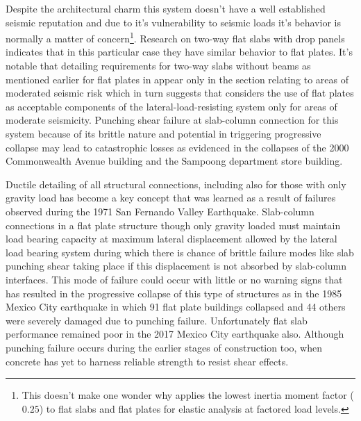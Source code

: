 Despite the architectural charm this system doesn't have a well established seismic reputation and due to it's vulnerability to seismic loads it's behavior is normally a matter of concern\footnote{This doesn't make one wonder why \citet[Table 6.6.3.1.1]{aci31819} applies the lowest inertia moment factor ($0.25$) to flat slabs and flat plates for elastic analysis at factored load levels.}\citep{HosahalliSomaprasadR1994SVoF,Derecho2001}. Research on two-way flat slabs with drop panels indicates that in this particular case they have similar behavior to flat plates\citep{odello1967behavior}. It's notable that detailing requirements for two-way slabs without beams as mentioned earlier for flat plates in \citet[Chapter 21]{aci31895} appear only in the section relating to areas of moderated seismic risk which in turn suggests that \cite{aci31895} considers the use of flat plates as acceptable components of the lateral-load-resisting system only for areas of moderate seismicity\citep{Derecho2001}. Punching shear failure at slab-column connection for this system because of its brittle nature and potential in triggering progressive collapse may lead to catastrophic losses as evidenced in the collapses of the 2000 Commonwealth Avenue building\citep{king2004} and the Sampoong department store building\citep{PARK2012119}.
    
Ductile detailing of all structural connections, including also for those with only gravity load has become a key concept that was learned as a result of failures observed during the 1971 San Fernando Valley Earthquake. Slab-column connections in a flat plate structure though only gravity loaded must maintain load bearing capacity at maximum lateral displacement allowed by the lateral load bearing system during which there is chance of brittle failure modes like slab punching shear taking place if this displacement is not absorbed by slab-column interfaces\citep{DoD2016}. This mode of failure could occur with little or no warning signs that has resulted in the progressive collapse of this type of structures as in the 1985 Mexico City earthquake in which 91 flat plate buildings collapsed and 44 others were severely damaged due to punching failure\citep{ghali2000stud}. Unfortunately flat slab performance remained poor in the 2017 Mexico City earthquake also\citep{isufi2020}. Although punching failure occurs during the earlier stages of construction too, when concrete has yet to harness reliable strength to resist shear effects\citep{gardner2011}. 

